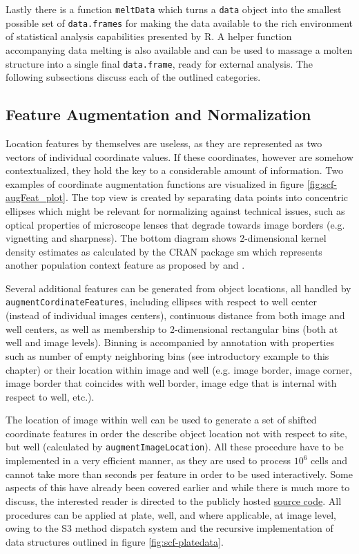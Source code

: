 Lastly there is a function \texttt{meltData} which turns a \texttt{data} object into the smallest possible set of \texttt{data.frames} for making the data available to the rich environment of statistical analysis capabilities presented by R. A helper function accompanying data melting is also available and can be used to massage a molten structure into a single final \texttt{data.frame}, ready for external analysis. The following subsections discuss each of the outlined categories.



\subsection{Feature Augmentation and Normalization}
\label{sec:scf-aug-norm}
Location features by themselves are useless, as they are represented as two vectors of individual coordinate values. If these coordinates, however are somehow contextualized, they hold the key to a considerable amount of information. Two examples of coordinate augmentation functions are visualized in figure \ref{fig:scf-augFeat_plot}. The top view is created by separating data points into concentric ellipses which might be relevant for normalizing against technical issues, such as optical properties of microscope lenses that degrade towards image borders (e.g. vignetting and sharpness). The bottom diagram shows 2-dimensional kernel density estimates as calculated by the CRAN package sm \citep{Bowman2014} which represents another population context feature as proposed by \cite{Knapp2011} and \cite{Snijder2012}.

Several additional features can be generated from object locations, all handled by \texttt{augmentCordinateFeatures}, including ellipses with respect to well center (instead of individual images centers), continuous distance from both image and well centers, as well as membership to 2-dimensional rectangular bins (both at well and image levels). Binning is accompanied by annotation with properties such as number of empty neighboring bins (see introductory example to this chapter) or their location within image and well (e.g. image border, image corner, image border that coincides with well border, image edge that is internal with respect to well, etc.).

The location of image within well can be used to generate a set of shifted coordinate features in order the describe object location not with respect to site, but well (calculated by \texttt{augmentImageLocation}). All these procedure have to be implemented in a very efficient manner, as they are used to process \tilde $10^6$ cells and cannot take more than seconds per feature in order to be used interactively. Some aspects of this have already been covered earlier and while there is much more to discuss, the interested reader is directed to the publicly hosted \href{https://github.com/nbenn/singleCellFeatures}{source code}. All procedures can be applied at plate, well, and where applicable, at image level, owing to the S3 method dispatch system and the recursive implementation of data structures outlined in figure \ref{fig:scf-platedata}.

